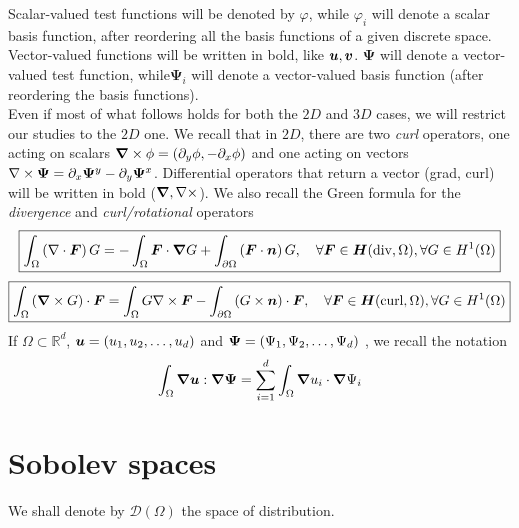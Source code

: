 %
Scalar-valued test functions will be denoted by $\varphi$, while $\varphi_i$ will denote a scalar basis function, after reordering all the basis functions of a given discrete space.
\\
Vector-valued functions will be written in bold, like $\bm{u}, \bm{v}$. $\boldsymbol{\Psi}$ will denote a vector-valued test function, while$\boldsymbol{\Psi}_i$ will denote a vector-valued basis function (after reordering the basis functions). 
\\
Even if most of what follows holds for both the $2D$ and $3D$ cases, we will restrict our studies to the $2D$ one. We recall that in $2D$, there are two \textit{curl} operators, one acting on scalars $\boldsymbol{\nabla} \times \phi = \left( \partial_y \phi, - \partial_x \phi \right)$ and one acting on vectors $\nabla \times \boldsymbol{\Psi} = \partial_x \boldsymbol{\Psi}^y - \partial_y \boldsymbol{\Psi}^x$. Differential operators that return a vector (grad, curl) will be written in bold ($\boldsymbol{\nabla}, \nabla \times$). 
%
%
We also recall the Green formula for the \textit{divergence} and \textit{curl/rotational} operators
%
\begin{align}
  \boxed{
    \int_{\Omega} \left( \nabla \cdot \bm{F} \right) G = - \int_{\Omega} \bm{F} \cdot \boldsymbol{\nabla} G 
    + \int_{\partial \Omega} \left( \bm{F} \cdot \bm{n} \right) G, \quad \forall \bm{F} \in \bm{H}(\mbox{div}, \Omega), \forall G \in H^1(\Omega)
  }
  \label{eq:green_div}
\end{align}
%
\begin{align}
  \boxed{
    \int_{\Omega} \left( \boldsymbol{\nabla} \times G \right) \cdot \bm{F} = \int_{\Omega} G \nabla \times \bm{F}  
    - \int_{\partial \Omega} \left( G \times \bm{n} \right) \cdot \bm{F}
    , \quad \forall \bm{F} \in \bm{H}(\mbox{curl}, \Omega), \forall G \in H^1(\Omega)
  }
  \label{eq:green_rot}
\end{align}
%
If $\Omega \subset \mathbb{R}^d$, $\bm{u} = \left( u_1, u_2, \ldots, u_d \right)$ and $\boldsymbol{\Psi} = \left( \Psi_1, \Psi_2, \ldots, \Psi_d \right)$ , we recall the notation 
%
\begin{align}
  \int_{\Omega} \boldsymbol{\nabla} \bm{u} : \boldsymbol{\nabla} \boldsymbol{\Psi} = \sum_{i=1}^d \int_{\Omega} \boldsymbol{\nabla} u_i \cdot \boldsymbol{\nabla} \Psi_i  
\end{align}

\section{Sobolev spaces}
We shall denote by $\mathcal{D}(\Omega)$ the space of distribution.
